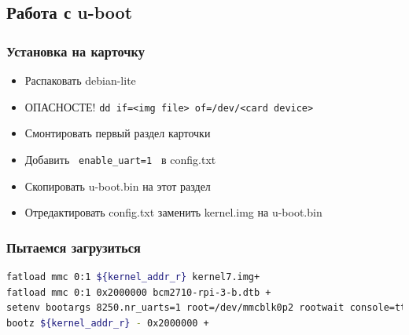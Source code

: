 \subsection{Работа с u-boot}

\begin{frame}[fragile]
  \frametitle{Установка на карточку}
  \begin{itemize}
      \item Распаковать debian-lite 
      \item ОПАСНОСТЕ! \verb+dd if=<img file> of=/dev/<card device> + 
      \item Смонтировать первый раздел карточки
      \item Добавить \verb+ enable_uart=1 + в config.txt
      \item Скопировать u-boot.bin на этот раздел
      \item Отредактировать config.txt заменить kernel.img на u-boot.bin
  \end{itemize}
\end{frame}


\begin{frame}[fragile]
  \frametitle{Пытаемся загрузиться}
\begin{lstlisting}[language=bash]
fatload mmc 0:1 ${kernel_addr_r} kernel7.img+ 
fatload mmc 0:1 0x2000000 bcm2710-rpi-3-b.dtb +
setenv bootargs 8250.nr_uarts=1 root=/dev/mmcblk0p2 rootwait console=ttyS0,115200 +
bootz ${kernel_addr_r} - 0x2000000 +
\end{lstlisting}
\end{frame}



